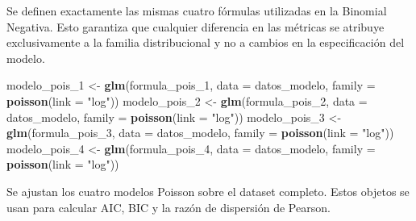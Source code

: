 \documentclass[
]{article}
\newenvironment{Shaded}{\begin{snugshade}}{\end{snugshade}}
\newcommand{\AttributeTok}[1]{\textcolor[rgb]{0.13,0.29,0.53}{#1}}
\newcommand{\FunctionTok}[1]{\textcolor[rgb]{0.13,0.29,0.53}{\textbf{#1}}}
\newcommand{\NormalTok}[1]{#1}
\newcommand{\OtherTok}[1]{\textcolor[rgb]{0.56,0.35,0.01}{#1}}
\newcommand{\StringTok}[1]{\textcolor[rgb]{0.31,0.60,0.02}{#1}}
\begin{document}
Se definen exactamente las mismas cuatro fórmulas utilizadas en la
Binomial Negativa. Esto garantiza que cualquier diferencia en las
métricas se atribuye exclusivamente a la familia distribucional y no a
cambios en la especificación del modelo.

\begin{Shaded}
\begin{Highlighting}[]
\NormalTok{modelo\_pois\_1 }\OtherTok{\textless{}{-}} \FunctionTok{glm}\NormalTok{(formula\_pois\_1, }\AttributeTok{data =}\NormalTok{ datos\_modelo, }\AttributeTok{family =} \FunctionTok{poisson}\NormalTok{(}\AttributeTok{link =} \StringTok{"log"}\NormalTok{))}
\NormalTok{modelo\_pois\_2 }\OtherTok{\textless{}{-}} \FunctionTok{glm}\NormalTok{(formula\_pois\_2, }\AttributeTok{data =}\NormalTok{ datos\_modelo, }\AttributeTok{family =} \FunctionTok{poisson}\NormalTok{(}\AttributeTok{link =} \StringTok{"log"}\NormalTok{))}
\NormalTok{modelo\_pois\_3 }\OtherTok{\textless{}{-}} \FunctionTok{glm}\NormalTok{(formula\_pois\_3, }\AttributeTok{data =}\NormalTok{ datos\_modelo, }\AttributeTok{family =} \FunctionTok{poisson}\NormalTok{(}\AttributeTok{link =} \StringTok{"log"}\NormalTok{))}
\NormalTok{modelo\_pois\_4 }\OtherTok{\textless{}{-}} \FunctionTok{glm}\NormalTok{(formula\_pois\_4, }\AttributeTok{data =}\NormalTok{ datos\_modelo, }\AttributeTok{family =} \FunctionTok{poisson}\NormalTok{(}\AttributeTok{link =} \StringTok{"log"}\NormalTok{))}
\end{Highlighting}
\end{Shaded}

Se ajustan los cuatro modelos Poisson sobre el dataset completo. Estos
objetos se usan para calcular AIC, BIC y la razón de dispersión de
Pearson.
\end{document}
